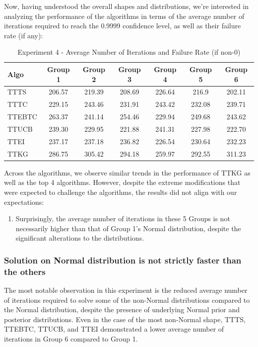 \documentclass[a4paper, 12pt]{article}
\theoremstyle{definition}
\begin{document}
Now, having understood the overall shapes and distributions, we're interested in analyzing the performance of the algorithms in terms of the average number of iterations required to reach the 0.9999 confidence level, as well as their failure rate (if any):

\begin{table}[hbt!]
\centering
\begin{tabular}{lcccccc}
\hline
Algo & Group 1 & Group 2 & Group 3 & Group 4 & Group 5 & Group 6 \\
\hline
TTTS & 206.57 & 219.39 & 208.69 & 226.64 & 216.9 & 202.11 \\
TTTC & 229.15 & 243.46 & 231.91 & 243.42 & 232.08 & 239.71 \\
TTEBTC & 263.37 & 241.14 & 254.46 & 229.94 & 249.68 & 243.62 \\
TTUCB & 239.30 & 229.95 & 221.88 & 241.31 & 227.98 & 222.70 \\
TTEI & 237.17 & 237.18 & 236.82 & 226.54 & 230.64 & 232.23 \\
TTKG & 286.75 & 305.42 & 294.18 & 259.97 & 292.55 & 311.23 \\
\hline
\end{tabular}
\caption{Experiment 4 - Average Number of Iterations and Failure Rate (if non-0)}
\label{table:exp4_iter}
\end{table}

Across the algorithms, we observe similar trends in the performance of TTKG as well as the top 4 algorithms. However, despite the extreme modifications that were expected to challenge the algorithms, the results did not align with our expectations:

\begin{enumerate}
    \item Surprisingly, the average number of iterations in these 5 Groups is not necessarily higher than that of Group 1's Normal distribution, despite the significant alterations to the distributions.
\end{enumerate}

\subsubsection{Solution on Normal distribution is not strictly faster than the others}
The most notable observation in this experiment is the reduced average number of iterations required to solve some of the non-Normal distributions compared to the Normal distribution, despite the presence of underlying Normal prior and posterior distributions. Even in the case of the most non-Normal shape, TTTS, TTEBTC, TTUCB, and TTEI demonstrated a lower average number of iterations in Group 6 compared to Group 1.
\end{document}
